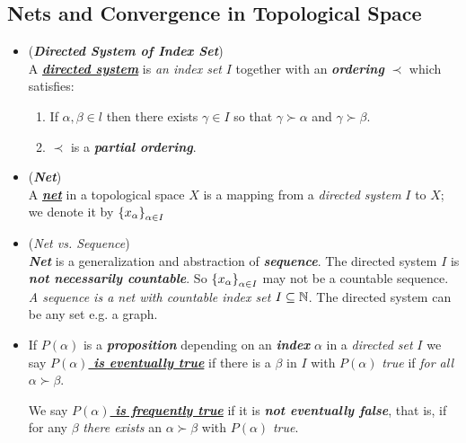 \documentclass[11pt]{article}
\begin{document}
\subsection{Nets and Convergence in Topological Space}
\begin{itemize}
\item \begin{definition} (\emph{\textbf{Directed System of Index Set}})\\
A \underline{\emph{\textbf{directed system}}} is \emph{an index set} $I$ together with an \emph{\textbf{ordering}} $\prec$ which satisfies:
\begin{enumerate}
\item If $\alpha, \beta \in l$ then there exists $\gamma \in I$ so that $\gamma \succ \alpha$ and $\gamma \succ \beta$.
\item $\prec$  is a \textbf{\emph{partial ordering}}.
\end{enumerate}
\end{definition}

\item \begin{definition} (\textbf{\emph{Net}})\\
A \underline{\emph{\textbf{net}}} in a topological space $X$ is a mapping from a \emph{directed system} $I$ to $X$; we denote it by $\left\{x_\alpha\right\}_{\alpha \in I}$
\end{definition}

\item \begin{remark} (\emph{Net vs. Sequence})\\
\emph{\textbf{Net}} is a generalization and abstraction of \emph{\textbf{sequence}}. The directed system $I$ is \emph{\textbf{not necessarily countable}}. So $\left\{x_\alpha\right\}_{\alpha \in I}$ may not be a countable sequence. \emph{A sequence is a net with countable index set $I \subseteq {\mathbb N}$}. The directed system can be any set e.g. a graph.
\end{remark}

\item \begin{definition}
If $P(\alpha)$ is a \emph{\textbf{proposition}} depending on an \emph{\textbf{index}} $\alpha$ in a \emph{directed set} $I$ we say \underline{\emph{\textbf{$P(\alpha)$ is eventually true}}} if there is a $\beta$ in $I$ with $P(\alpha)$ \emph{true} if \emph{for all} $\alpha \succ \beta$. 

We say \underline{\emph{\textbf{$P(\alpha)$ is frequently true}}} if it is \emph{\textbf{not eventually false}}, that is, if for any $\beta$ \emph{there exists} an $\alpha \succ \beta$ with $P(\alpha)$ \emph{true}.
\end{definition}


\end{itemize}
\end{document}
